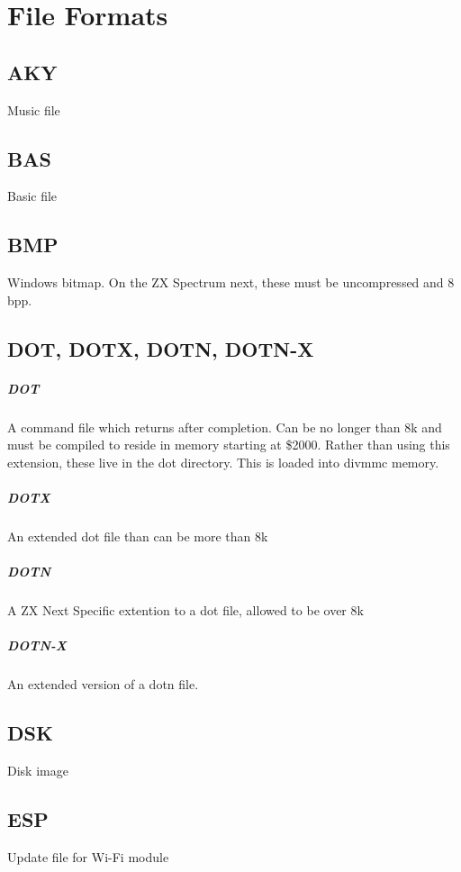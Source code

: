 \chapter{File Formats}
\section{AKY}
Music file
\section{BAS}
Basic file
\section{BMP}
Windows bitmap. On the ZX Spectrum next, these must be uncompressed
and 8 bpp.
\section{DOT, DOTX, DOTN, DOTN-X}
\paragraph{DOT}
A command file which returns after completion. Can be no longer than
8k and must be compiled to reside in memory starting at \$2000. Rather
than using this extension, these live in the dot directory. This is
loaded into divmmc memory.

\paragraph{DOTX}
An extended dot file than can be more than 8k

\paragraph{DOTN}
A ZX Next Specific extention to a dot file, allowed to be over 8k

\paragraph{DOTN-X}
An extended version of a dotn file.

\section{DSK}
Disk image
\section{ESP}
Update file for Wi-Fi module
